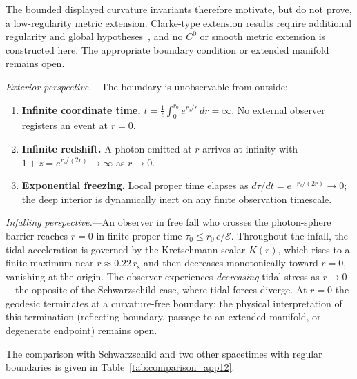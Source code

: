 \documentclass[11pt]{article}
\newcommand{\rs}{r_{\mathrm{s}}}
\begin{document}
The bounded displayed curvature invariants therefore motivate,
but do not prove, a low-regularity metric extension.
Clarke-type extension results require additional regularity and
global hypotheses~\cite{Clarke1993,Racz2023}, and no $C^{0}$
or smooth metric extension is constructed here.  The appropriate
boundary condition or extended manifold remains open.

\medskip

\textit{Exterior perspective.}---The boundary is
unobservable from outside:
\begin{enumerate}
\item \textbf{Infinite coordinate time.}
  $\displaystyle
  t = \frac{1}{c}\int_{0}^{r_{0}}
  e^{\rs/r}\,dr = \infty$.
  No external observer registers an event at $r=0$.

\item \textbf{Infinite redshift.}
  A photon emitted at $r$ arrives at infinity with
  $1 + z = e^{\rs/(2r)} \to \infty$ as $r \to 0$.

\item \textbf{Exponential freezing.}
  Local proper time elapses as
  $d\tau/dt = e^{-\rs/(2r)} \to 0$; the deep
  interior is dynamically inert on any finite
  observation timescale.
\end{enumerate}

\textit{Infalling perspective.}---An observer in
free fall who crosses the photon-sphere barrier
reaches $r = 0$ in finite proper time
$\tau_{0} \leq r_{0}\,c/\mathcal{E}$.
Throughout the infall, the tidal acceleration is
governed by the Kretschmann scalar $K(r)$, which
rises to a finite maximum near $r\approx 0.22\,\rs$ and
then decreases monotonically toward $r=0$, vanishing
at the origin.  The observer experiences
\emph{decreasing} tidal stress as $r \to 0$---the
opposite of the Schwarzschild case, where tidal
forces diverge.  At $r = 0$ the geodesic terminates
at a curvature-free boundary; the physical
interpretation of this termination (reflecting
boundary, passage to an extended manifold, or
degenerate endpoint) remains open.

\medskip

The comparison with Schwarzschild and two other
spacetimes with regular boundaries is given in
Table~\ref{tab:comparison_app12}.
\end{document}
